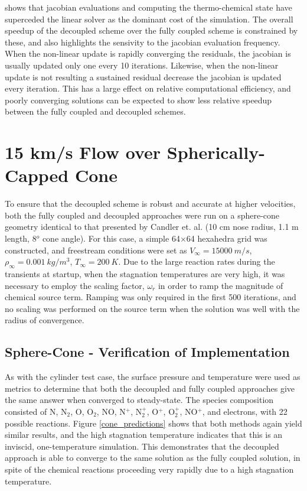  shows that jacobian evaluations and computing the
thermo-chemical state have superceded the linear solver as the dominant cost of
the simulation.  The overall speedup of the decoupled scheme over the fully
coupled scheme is constrained by these, and also highlights the sensivity to the
jacobian evaluation frequency.  When the non-linear update is rapidly converging
the residuals, the jacobian is usually updated only one every 10 iterations.
Likewise, when the non-linear update is not resulting a sustained residual
decrease the jacobian is updated every iteration.  This has a large effect on
relative computational efficiency, and poorly converging solutions can be
expected to show less relative speedup between the fully coupled and decoupled
schemes.

\section{15 km/s Flow over Spherically-Capped Cone}
\label{sec:15-kps-sphere-cone}

To ensure that the decoupled scheme is robust and accurate at higher velocities, both the
fully coupled and decoupled approaches were run on a sphere-cone geometry
identical to that presented by Candler et. al. \cite{candler} (10 cm nose
radius, 1.1 m length, 8$^o$ cone angle).  For this case, a simple 64$\times$64
hexahedra grid was constructed, and freestream conditions were set as
$V_{\infty} = 15000\ m/s$, $\rho_{\infty}=0.001\ kg/m^3$, $T_\infty = 200\ K$.
Due to the large reaction rates during the transients at startup, when the
stagnation temperatures are very high, it was necessary to employ the scaling
factor, $\omega_r$ in order to ramp the magnitude of chemical source term.
Ramping was only required in the first 500 iterations, and no scaling was
performed on the source term when the solution was well with the radius of
convergence.

\subsection{Sphere-Cone - Verification of Implementation} 

As with the cylinder test case, the surface pressure and temperature were used
as metrics to determine that both the decoupled and fully coupled approaches
give the same answer when converged to steady-state. The species composition
consisted of N, $\text{N}_2$, O, $\text{O}_2$, NO, N$^+$, $\text{N}_2^+$, O$^+$,
$\text{O}_2^+$, NO$^+$, and electrons, with 22 possible reactions. Figure
\ref{cone_predictions} shows that both methods again yield similar results, and
the high stagnation temperature indicates that this is an inviscid,
one-temperature simulation.  This demonstrates that the decoupled approach is
able to converge to the same solution as the fully coupled solution, in spite of
the chemical reactions proceeding very rapidly due to a high stagnation
temperature.

